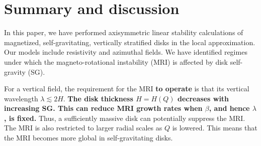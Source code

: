 \section{Summary and discussion}\label{summary}
In this paper, we have performed axisymmetric linear stability
calculations of magnetized, self-gravitating, vertically stratified
disks in the local approximation. Our models include resistivity and
azimuthal fields. We have identified regimes under which the
magneto-rotational instability (MRI) is affected by disk self-gravity
(SG).   


For a vertical field, the requirement for the MRI {\bf to operate} is that   
its vertical wavelength $\lambda \lesssim 2H$. 
{\bf 
The disk thickness $H=H(Q)$ decreases with increasing SG. This can
reduce MRI growth rates when 
$\beta$, and hence $\lambda$, is fixed.  
}
Thus, a sufficiently massive disk can potentially suppress the MRI. 
The MRI is also restricted to larger radial 
scales as $Q$ is lowered. This means that the MRI becomes more global
in self-gravitating disks. 

